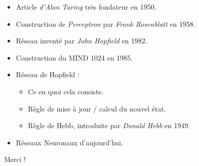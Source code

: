 \documentclass{beamer}
\begin{document}
\begin{frame}[allowframebreaks]
    \begin{itemize}
        \item Article \textit{d'Alan Turing} très fondateur en 1950.
        \item Construction de \textit{Perceptron} par \textit{Frank Rosenblatt} en 1958.
        \item Réseau inventé par \textit{John Hopfield} en 1982.
        \item Construction du MIND 1024 en 1985.
        \item Réseau de Hopfield :
            \begin{itemize}
                \item Ce en quoi cela consiste.
                \item Règle de mise à jour / calcul du nouvel état.
                \item Règle de Hebb, introduite par \textit{Donald Hebb} en 1949.
            \end{itemize}
        \item Réseaux Neuronaux d'aujourd'hui.
    \end{itemize}
\end{frame}

\begin{frame}
    \begin{center}
        {\Huge\calligra Merci !}
    \end{center}
\end{frame}
\end{document}
